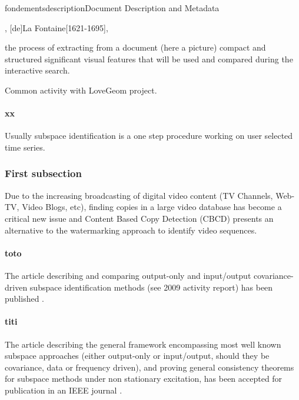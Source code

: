 \documentclass{ra2011}
\begin{document}
\begin{module}{fondements}{description}{Document Description and Metadata}


\begin{participants}
,
[de]{La Fontaine}[1621-1695],
\end{participants}

\begin{glossaire}
 {the process of extracting from a
  document (here a picture) compact and structured significant visual 
  features that will be used and compared during the interactive
  search.}
\end{glossaire}

\begin{moreinfo}
Common activity with LoveGeom project. 
\end{moreinfo}

\paragraph{xx}
Usually subspace identification is a one step procedure working on user selected time series. 

\subsubsection{First subsection}
Due to the increasing broadcasting of digital video content (TV
 Channels, Web-TV, Video Blogs, etc), finding copies in a large video
 database has become a critical new issue and Content Based Copy
 Detection (CBCD) presents an alternative to the watermarking
 approach to identify video sequences.

\paragraph{toto}
The article describing and comparing output-only and input/output covariance-driven subspace 
identification methods (see 2009 activity report) has been published \cite {Mlb-MpdSR}.

\paragraph{titi}
The article describing the general framework encompassing 
most well known subspace approaches (either output-only or input/output, 
should they be covariance, data or frequency driven),
and proving general consistency theorems for subspace methods under non stationary excitation,
has been accepted for publication in
an IEEE journal \cite{bretollet}.



\end{module}
\end{document}
